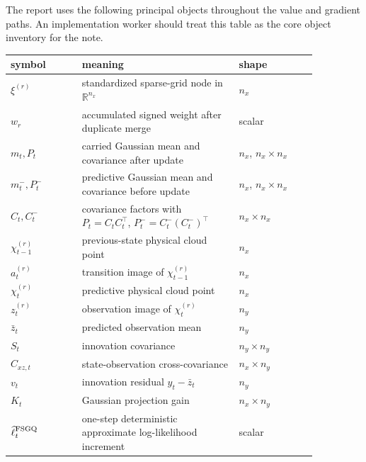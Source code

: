 \documentclass[11pt]{article}
\numberwithin{equation}{section}
\newcommand{\R}{\mathbb R}
\newcommand{\ellhat}{\widehat\ell}
\begin{document}
The report uses the following principal objects throughout the value and
gradient paths.  An implementation worker should treat this table as the core
object inventory for the note.
\begin{center}
\small
\begin{tabular}{p{0.20\linewidth}p{0.44\linewidth}p{0.22\linewidth}}
\toprule
symbol & meaning & shape \\
\midrule
\(\xi^{(r)}\) & standardized sparse-grid node in \(\R^{n_x}\) & \(n_x\) \\
\(w_r\) & accumulated signed weight after duplicate merge & scalar \\
\(m_t,P_t\) & carried Gaussian mean and covariance after update & \(n_x\), \(n_x\times n_x\) \\
\(m_t^-,P_t^-\) & predictive Gaussian mean and covariance before update & \(n_x\), \(n_x\times n_x\) \\
\(C_t, C_t^-\) & covariance factors with \(P_t=C_tC_t^\top\), \(P_t^-=C_t^-(C_t^-)^\top\) & \(n_x\times n_x\) \\
\(\chi_{t-1}^{(r)}\) & previous-state physical cloud point & \(n_x\) \\
\(a_t^{(r)}\) & transition image of \(\chi_{t-1}^{(r)}\) & \(n_x\) \\
\(\chi_t^{(r)}\) & predictive physical cloud point & \(n_x\) \\
\(z_t^{(r)}\) & observation image of \(\chi_t^{(r)}\) & \(n_y\) \\
\(\bar z_t\) & predicted observation mean & \(n_y\) \\
\(S_t\) & innovation covariance & \(n_y\times n_y\) \\
\(C_{xz,t}\) & state-observation cross-covariance & \(n_x\times n_y\) \\
\(v_t\) & innovation residual \(y_t-\bar z_t\) & \(n_y\) \\
\(K_t\) & Gaussian projection gain & \(n_x\times n_y\) \\
\(\ellhat_t^{\rm FSGQ}\) & one-step deterministic approximate log-likelihood increment & scalar \\
\bottomrule
\end{tabular}
\end{center}
\end{document}
